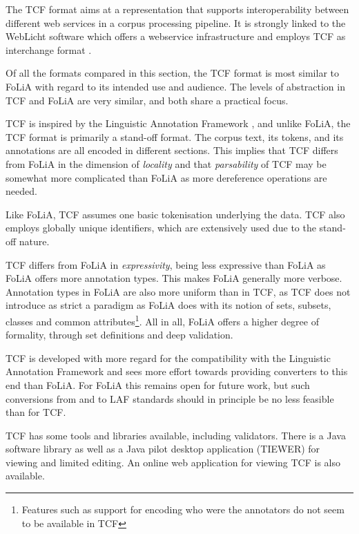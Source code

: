 \documentclass[a4paper,10pt,twoside]{article}
\begin{document}
The TCF format aims at a representation that supports interoperability between
different web services in a corpus processing pipeline. It is strongly linked to
the WebLicht software which offers a webservice infrastructure and employs
TCF as interchange format \cite{WEBLICHT}.

Of all the formats compared in this section, the TCF format is most similar to
FoLiA with regard to its intended use and audience. The levels of abstraction in
TCF and FoLiA are very similar, and both share a practical focus.

TCF is inspired by the Linguistic Annotation Framework \cite{LAF}, and unlike
FoLiA, the TCF format is primarily a stand-off format. The corpus text, its
tokens, and its annotations are all encoded in different sections.  This
implies that TCF differs from FoLiA in the dimension of \emph{locality} and
that \emph{parsability} of TCF may be somewhat more complicated than FoLiA as more
dereference operations are needed.

Like FoLiA, TCF assumes one basic tokenisation underlying the data. TCF also
employs globally unique identifiers, which are extensively used due to the
stand-off nature.

TCF differs from FoLiA in \emph{expressivity}, being less expressive than FoLiA
as FoLiA offers more annotation types. This makes FoLiA generally more verbose.
Annotation types in FoLiA are also more uniform than in TCF, as TCF does not
introduce as strict a paradigm as FoLiA does with its notion of sets, subsets,
classes and common attributes\footnote{Features such as support for encoding
who were the annotators do not seem to be available in TCF}.  All in all, FoLiA
offers a higher degree of formality, through set definitions and deep
validation.

TCF is developed with more regard for the compatibility with the Linguistic
Annotation Framework \cite{LAF} and sees more effort towards providing converters to this end
than FoLiA. For FoLiA this remains open for future work, but such conversions
from and to LAF standards should in principle be no less feasible than for TCF.


TCF has some tools and libraries available, including validators. There is a
Java software library as well as a Java pilot desktop application (TIEWER) for
viewing and limited editing. An online web application for viewing TCF is also
available.
\end{document}
